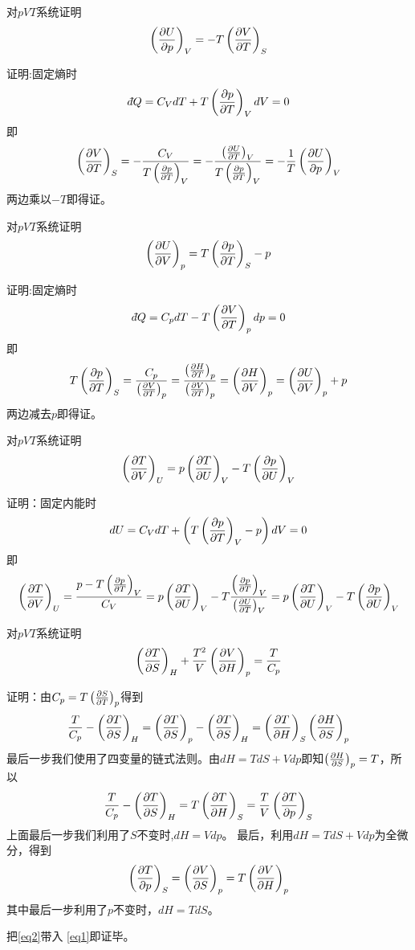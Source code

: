 \documentclass[CJK]{beamer}
\begin{document}
\begin{frame}
  \bch
  对$pVT$系统证明
  $$\pfrac UpV = -T\pfrac VTS$$
  \ech
\end{frame}


\begin{frame}
  \bch
  证明:固定熵时
  $$ \dbar Q = C_V dT + T \pfrac pTV dV = 0 $$
  即
  $$ \pfrac VTS = -\frac{C_V}{T\pfrac pTV} = -\frac{\pfrac UTV}{T\pfrac pTV} = -\frac{1}{T} \pfrac UpV $$
  两边乘以$-T$即得证。
  \ech
\end{frame}

\begin{frame}
  \bch
  对$pVT$系统证明
  $$\pfrac UVp = T\pfrac pTS - p$$
  \ech
\end{frame}


\begin{frame}
  \bch
  证明:固定熵时
  $$ \dbar Q = C_p dT - T\pfrac VTp dp = 0 $$
  即
  $$ T\pfrac pTS = \frac{C_p}{\pfrac VTp} = \frac{\pfrac HTp}{\pfrac VTp} =  \pfrac HVp = \pfrac UVp + p $$
  两边减去$p$即得证。
  \ech
\end{frame}

\begin{frame}
  \bch
  对$pVT$系统证明
  $$\pfrac TVU = p\pfrac TUV - T\pfrac pUV $$
  \ech
\end{frame}


\begin{frame}
  \bch
  证明：固定内能时
  $$ dU = C_V dT + \left(T\pfrac pTV - p\right)dV = 0$$
  即
  {\scriptsize
  $$ \pfrac TVU = \frac{p-T\pfrac pTV }{C_V} = p\pfrac TUV - T\frac{\pfrac pTV}{\pfrac UTV}  = p\pfrac TUV - T\pfrac pUV $$}
  \ech
\end{frame}

\begin{frame}
  \bch
  对$pVT$系统证明
  $$\pfrac TSH +\frac{T^2}{V} \pfrac VHp = \frac{T}{C_p} $$
  \ech
\end{frame}

\begin{frame}
  \bch
  {\scriptsize
  证明：由$C_p = T\pfrac STp$得到
  $$ \frac{T}{C_p} - \pfrac TSH = \pfrac TSp - \pfrac TSH = \pfrac THS \pfrac HSp $$
  最后一步我们使用了四变量的链式法则。由$dH = TdS + Vdp$即知$\pfrac HSp = T$，所以
  \begin{equation}
    \frac{T}{C_p} - \pfrac TSH = T \pfrac THS = \frac{T}{V} \pfrac TpS \label{eq1}
  \end{equation}
  上面最后一步我们利用了$S$不变时,$ dH = Vdp$。
  最后，利用$dH  = TdS +Vdp$为全微分，得到
  \begin{equation}
    \pfrac TpS = \pfrac VSp = T\pfrac VHp \label{eq2}
  \end{equation}
  其中最后一步利用了$p$不变时，$dH = TdS$。

  把\eqref{eq2}带入 \eqref{eq1}即证毕。
  
  }
  \ech
\end{frame}
\end{document}
